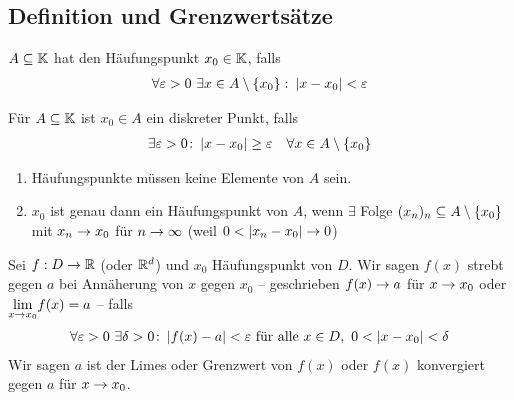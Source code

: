 \subsection{Definition und Grenzwertsätze}
\thispagestyle{pagenumberonly}

\begin{definition}[Häufungspunkte]
    $A\subseteq\mathbb{K}$ hat den Häufungspunkt $x_0\in\mathbb{K}$, falls
    \begin{align*}
        \forall\varepsilon > 0~\exists x\in A\setminus\left\{x_0\right\}\colon \left\lvert x-x_0\right\rvert < \varepsilon
    \end{align*}
\end{definition}

\begin{definition}
    Für $A\subseteq\mathbb{K}$ ist $x_0\in A$ ein diskreter Punkt, falls
    \begin{align*}
        \exists \varepsilon > 0\colon \left\lvert x-x_0\right\rvert \geq \varepsilon\quad\forall x\in A\setminus\left\{x_0\right\}
    \end{align*}
\end{definition}

\begin{bemerkung}
    \theoremescape
    \begin{enumerate}[label=(\roman*)]
        \item Häufungspunkte müssen keine Elemente von $A$ sein.
        \item $x_0$ ist genau dann ein Häufungspunkt von $A$, wenn $\exists$ Folge $(x_n)_n\subseteq A\setminus\left\{x_0\right\}$ mit $x_n\rightarrow{} x_0$ für $n\rightarrow{}\infty$ (weil $0<\left\lvert x_n-x_0\right\rvert\rightarrow{} 0$)
    \end{enumerate}
\end{bemerkung}

\begin{definition}
    Sei $f: D\rightarrow{}\mathbb{R}$ (oder $\mathbb{R}^d$) und $x_0$ Häufungspunkt von $D$. Wir sagen $f(x)$ strebt gegen $a$ bei Annäherung von $x$ gegen $x_0$ -- geschrieben $f(x)\rightarrow{} a$ für $x\rightarrow{} x_0$ oder ${\displaystyle \lim_{x\rightarrow{} x_0}} f(x) = a$ -- falls
    \begin{align*}
        \forall \varepsilon > 0~\exists \delta > 0\colon \left\lvert f(x)-a\right\rvert < \varepsilon \text{ für alle } x\in D,~0 < \left\lvert x-x_0\right\rvert < \delta
    \end{align*}
    Wir sagen $a$ ist der Limes oder Grenzwert von $f(x)$ oder $f(x)$ konvergiert gegen $a$ für $x\rightarrow{} x_0$.
\end{definition}

